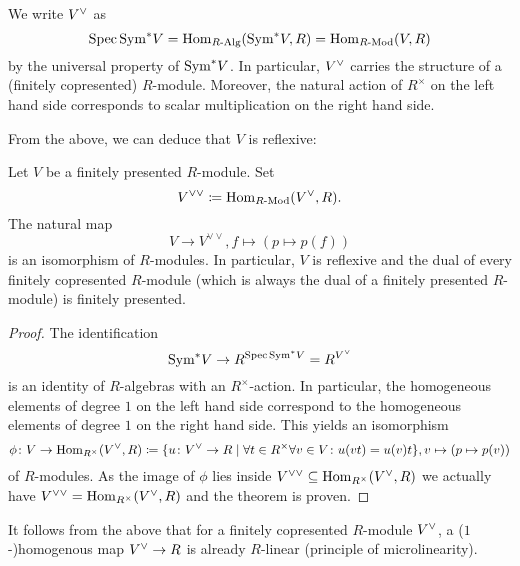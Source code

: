 \begin{remark}
  We write $V\spcheck$ as
  \begin{equation*}
    \operatorname{Spec} \mathrm{Sym}^* V = \mathrm{Hom}_{R\text{-}\mathrm{Alg}}(\mathrm{Sym}^* V, R) = \mathrm{Hom}_{R\text{-}\mathrm{Mod}}(V, R)
  \end{equation*}
  by the universal property of $\mathrm{Sym}^* V$.  In particular, $V\spcheck$
  carries the structure of a (finitely copresented) $R$-module.
  Moreover, the natural action of $R^\times$ on the left hand side
  corresponds to scalar multiplication on the right hand side.
\end{remark}

From the above, we can deduce that $V$ is reflexive:

\begin{theorem}
  Let $V$ be a finitely presented $R$-module.  Set
  \begin{equation*}
    V^{\vee\vee} \coloneqq \Hom_{\Mod R}(V\spcheck, R).
  \end{equation*}
  The natural map
  \begin{equation*}
    V \to V^{\vee\vee}, f \mapsto (p \mapsto p(f))
  \end{equation*}
  is an isomorphism of $R$-modules.  In particular, $V$ is reflexive
  and the dual of every finitely copresented $R$-module (which is
  always the dual of a finitely presented $R$-module) is finitely
  presented.
\end{theorem}

\begin{proof}
  The identification
  \begin{equation*}
    \Sym^* V \to R^{\Spec \Sym^* V} = R^{V\spcheck}
  \end{equation*}
  is an identity of $R$-algebras with an $R^\times$-action.  In
  particular, the homogeneous elements of degree $1$ on the left hand
  side correspond to the homogeneous elements of degree $1$ on the
  right hand side.  This yields an isomorphism
  \begin{equation*}
    \phi\colon V \to \Hom_{R^\times}(V\spcheck, R) \coloneqq \{u\colon V\spcheck \to R \mid \forall t \in R^\times\forall v \in V\colon u(vt) = u(v) t\},
    v \mapsto (p \mapsto p(v))
  \end{equation*}
  of $R$-modules.  As the image of $\phi$ lies inside
  $V^{\vee\vee} \subseteq \Hom_{R^\times}(V\spcheck, R)$ we
  actually have $V^{\vee\vee} = \Hom_{R^\times}(V\spcheck, R)$ and
  the theorem is proven.
\end{proof}

\begin{remark}
  It follows from the above that for a finitely copresented $R$-module
  $V\spcheck$, a ($1$-)homogenous map $V\spcheck \to R$ is already
  $R$-linear (principle of microlinearity).
\end{remark}



